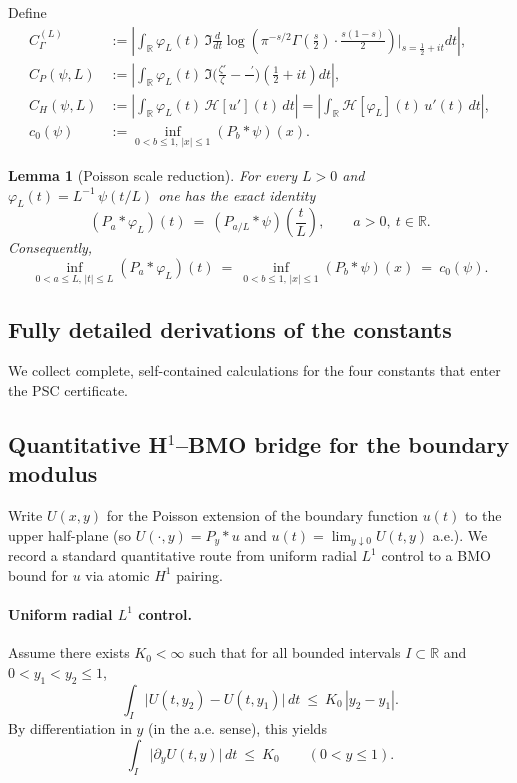 \documentclass[11pt]{article}
\newtheorem{lemma}[theorem]{Lemma}
\theoremstyle{definition}
\theoremstyle{remark}
\newcommand{\R}{\mathbb{R}}
\newcommand{\Poisson}{P}
\DeclareMathOperator{\dettwo}{det_2}
\begin{document}
Define
\begin{align*}
 C_\Gamma^{(L)} &:= \left|\int_\R \varphi_L(t)\,\Im\frac{d}{dt}\log\!\left(\pi^{-s/2}\Gamma\!\left(\frac{s}{2}\right)\cdot\frac{s(1-s)}{2}\right)\!\Big|_{s=\frac12+it} dt\right|,\\
 C_P(\psi,L) &:= \left|\int_\R \varphi_L(t)\,\Im\Big(\frac{\zeta'}{\zeta}-\frac{\dettwo'}{\dettwo}\Big)\!\left(\tfrac12+it\right) dt\right|,\\
 C_H(\psi,L) &:= \left|\int_\R \varphi_L(t)\,\mathcal H[u'](t)\,dt\right|=\left|\int_\R \mathcal H[\varphi_L](t)\,u'(t)\,dt\right|,\\
 c_0(\psi) &:= \inf_{0<b\le 1,\,|x|\le 1} (\Poisson_b*\psi)(x).
\end{align*}
\begin{lemma}[Poisson scale reduction]\label{lem:poisson-scale}
For every $L>0$ and $\varphi_L(t)=L^{-1}\,\psi(t/L)$ one has the exact identity
\[
  (\Poisson_a*\varphi_L)(t)\ =\ (\Poisson_{a/L}*\psi)\!\left(\frac{t}{L}\right),\qquad a>0,\ t\in\R.
\]
Consequently,
\[
  \inf_{0<a\le L,\,|t|\le L}(\Poisson_a*\varphi_L)(t)\ =\ \inf_{0<b\le 1,\,|x|\le 1}(\Poisson_b*\psi)(x)\ =\ c_0(\psi).
\]
\end{lemma}


\subsection*{Fully detailed derivations of the constants}

We collect complete, self-contained calculations for the four constants that enter the PSC certificate.

\subsection*{Quantitative H$^1$--BMO bridge for the boundary modulus}
Write $U(x,y)$ for the Poisson extension of the boundary function $u(t)$ to the upper half-plane (so $U(\cdot,y)=P_y*u$ and $u(t)=\lim_{y\downarrow 0}U(t,y)$ a.e.). We record a standard quantitative route from uniform radial $L^1$ control to a BMO bound for $u$ via atomic $H^1$ pairing.

\paragraph{Uniform radial $L^1$ control.}
Assume there exists $K_0<\infty$ such that for all bounded intervals $I\subset\R$ and $0<y_1<y_2\le 1$,
\begin{equation}\label{eq:radial-L1-bridge}
  \int_I \big|U(t,y_2)-U(t,y_1)\big|\,dt\ \le\ K_0\,|y_2-y_1|.
\end{equation}
By differentiation in $y$ (in the a.e. sense), this yields
\begin{equation}\label{eq:dyU-L1-bridge}
  \int_I \big|\partial_y U(t,y)\big|\,dt\ \le\ K_0\qquad(0<y\le 1).
\end{equation}
\end{document}
